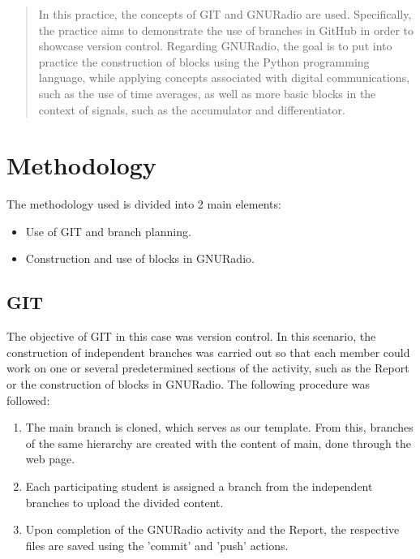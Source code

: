 \documentclass{journal}[IEEEtran, twocolumn]             %
\begin{document}
\begin{multicols}{2}

\begin{abstract}
    In this practice, the concepts of GIT and GNURadio are used. Specifically, the practice aims to demonstrate the use of branches in GitHub in order to showcase version control. Regarding GNURadio, the goal is to put into practice the construction of blocks using the Python programming language, while applying concepts associated with digital communications, such as the use of time averages, as well as more basic blocks in the context of signals, such as the accumulator and differentiator.

\end{abstract}

\section{Methodology}
The methodology used is divided into 2 main elements:

\begin{itemize}
    \item Use of GIT and branch planning.
    \item Construction and use of blocks in GNURadio.
\end{itemize}

\subsection{GIT}
The objective of GIT in this case was version control. In this scenario, the construction of independent branches was carried out so that each member could work on one or several predetermined sections of the activity, such as the Report or the construction of blocks in GNURadio. The following procedure was followed:

\begin{enumerate}

    \item The main branch is cloned, which serves as our template. From this, branches of the same hierarchy are created with the content of main, done through the web page.
    
    \item Each participating student is assigned a branch from the independent branches to upload the divided content.
    
    \item  Upon completion of the GNURadio activity and the Report, the respective files are saved using the 'commit' and 'push' actions.
    

\end{enumerate}
\end{multicols}
\end{document}
